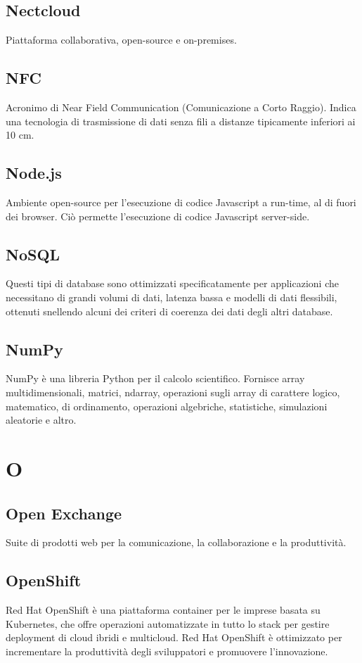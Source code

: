 \subsection{Nectcloud} Piattaforma collaborativa, open-source e on-premises.
\subsection{NFC} Acronimo di Near Field Communication (Comunicazione a Corto Raggio). Indica una tecnologia di trasmissione di dati senza fili a distanze tipicamente inferiori ai 10 cm.
\subsection{Node.js} Ambiente open-source per l'esecuzione di codice Javascript a run-time, al di fuori dei browser. Ciò permette l'esecuzione di codice Javascript server-side.
\subsection{NoSQL} Questi tipi di database sono ottimizzati specificatamente per applicazioni che necessitano di grandi volumi di dati, latenza bassa e modelli di dati flessibili, ottenuti snellendo alcuni dei criteri di coerenza dei dati degli altri database.
\subsection{NumPy} NumPy è una libreria Python per il calcolo scientifico. Fornisce array multidimensionali, matrici, ndarray, operazioni sugli array di carattere logico, matematico, di ordinamento, operazioni algebriche, statistiche, simulazioni aleatorie e altro.
\newpage \section{O}
\subsection{Open Exchange} Suite di prodotti web per la comunicazione, la collaborazione e la produttività.
\subsection{OpenShift} Red Hat OpenShift è una piattaforma container per le imprese basata su Kubernetes, che offre operazioni automatizzate in tutto lo stack per gestire deployment di cloud ibridi e multicloud. Red Hat OpenShift è ottimizzato per incrementare la produttività degli sviluppatori e promuovere l'innovazione. 
